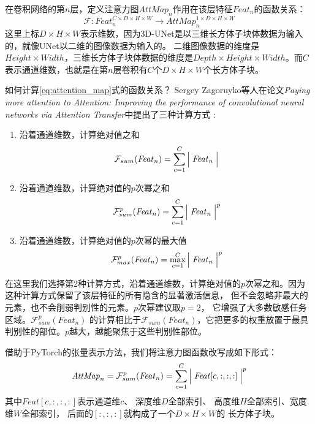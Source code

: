 在卷积网络的第$n$层，定义注意力图$\mathit{AttMap}_{n}$作用在该层特征$\mathit{Feat}_{n}$的函数关系：
\begin{equation}\label{eq:attention_map}
    \mathcal{F}: \mathit{Feat}_{n}^{C \times D \times H \times W} \longrightarrow \mathit{AttMap}_{n}^{1 \times D \times H \times W}
\end{equation}
这里上标$D \times H \times W$表示维数，因为3D-UNet是以三维长方体子块体数据为输入的，就像UNet以二维的图像数据为输入的。
二维图像数据的维度是$Height \times Width$，三维长方体子块体数据的维度是$Depth \times Height \times Width$。而$C$
表示通道维数，也就是在第$n$层卷积有$C$个$D \times H \times W$个长方体子块。

如何计算\ref{eq:attention_map}式的函数关系？ Sergey Zagoruyko等人在论文\textit{Paying more attention to Attention: 
Improving the performance of convolutional neural networks via Attention Transfer}中提出了三种计算方式
\cite{Zagoruyko2016PayingMA}:
\begin{enumerate}
    \item 沿着通道维数，计算绝对值之和  
    \begin{equation}
        \mathcal{F}_{sum}(\mathit{Feat}_{n}) = \sum_{c=1}^{C}{\Bigm| \mathit{Feat}_{n}\Bigm|}
    \end{equation}
    
    \item 沿着通道维数，计算绝对值的$p$次幂之和
    \begin{equation}
        \mathcal{F}_{sum}^{p}(\mathit{Feat}_{n}) = \sum_{c=1}^{C}{\Bigm| \mathit{Feat}_{n} \Bigm|}^{p}
    \end{equation}
    
    \item 沿着通道维数，计算绝对值的$p$次幂的最大值
    \begin{equation}
        \mathcal{F}_{max}^{p}(\mathit{Feat}_{n}) = \max_{c=1}^{C}{\Bigm| \mathit{Feat}_{n} \Bigm|}^{p}
    \end{equation}
\end{enumerate}
在这里我们选择第2种计算方式，沿着通道维数，计算绝对值的$p$次幂之和。因为这种计算方式保留了该层特征的所有隐含的显著激活信息，
但不会忽略非最大的元素，也不会削弱判别性的元素。$p$次幂建议取$p = 2$， 它增强了大多数敏感任务区域。$\mathcal{F}_{sum}^{p}({Feat}_{n})$
的计算相比于$\mathcal{F}_{sum}(\mathit{Feat}_{n})$，它把更多的权重放置于最具判别性的部位。$p$越大，越能聚焦于这些判别性部位。

借助于PyTorch的张量表示方法，我们将注意力图函数改写成如下形式：
\begin{equation}
    \mathit{AttMap}_{n} = \mathcal{F}_{sum}^{p}(\mathit{Feat}_{n}) = \sum_{c=1}^{C}{\Bigm|{\mathit{Feat}}[c, :, :, :]\Bigm|}^{p}
\end{equation}
其中$\mathit{Feat}[c, :, :, :]$表示通道维$c$、 深度维$D$全部索引、 高度维$H$全部索引、宽度维$W$全部索引， 后面的$[:, :, :]$就构成了一个$D \times H \times W$的
长方体子块。

